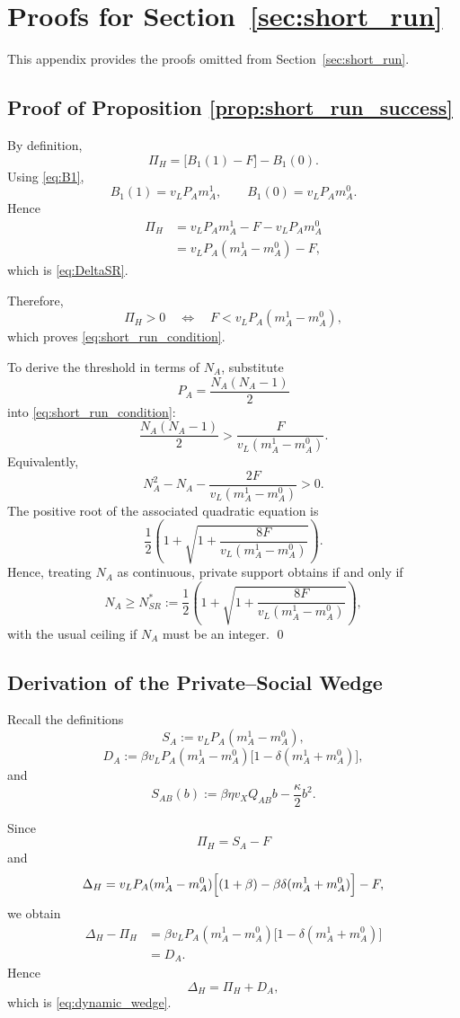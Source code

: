 \section{Proofs for Section~\ref{sec:short_run}}

This appendix provides the proofs omitted from Section~\ref{sec:short_run}.

\subsection{Proof of Proposition \ref{prop:short_run_success}}

By definition,
\[
\Pi_H
=
\bigl[B_1(1)-F\bigr]-B_1(0).
\]
Using \eqref{eq:B1},
\[
B_1(1)=v_LP_A m_A^1,
\qquad
B_1(0)=v_LP_A m_A^0.
\]
Hence
\begin{align}
\Pi_H
&=
v_LP_A m_A^1-F-v_LP_A m_A^0
\nonumber\\
&=
v_LP_A(m_A^1-m_A^0)-F,
\label{eq:app5_PiH}
\end{align}
which is \eqref{eq:DeltaSR}.

Therefore,
\[
\Pi_H>0
\quad\Longleftrightarrow\quad
F<v_LP_A(m_A^1-m_A^0),
\]
which proves \eqref{eq:short_run_condition}.

To derive the threshold in terms of $N_A$, substitute
\[
P_A=\frac{N_A(N_A-1)}{2}
\]
into \eqref{eq:short_run_condition}:
\[
\frac{N_A(N_A-1)}{2}>
\frac{F}{v_L(m_A^1-m_A^0)}.
\]
Equivalently,
\[
N_A^2-N_A-\frac{2F}{v_L(m_A^1-m_A^0)}>0.
\]
The positive root of the associated quadratic equation is
\[
\frac{1}{2}
\left(
1+
\sqrt{1+\frac{8F}{v_L(m_A^1-m_A^0)}}
\right).
\]
Hence, treating $N_A$ as continuous, private support obtains if and only if
\[
N_A\ge
N_{SR}^*
:=
\frac{1}{2}
\left(
1+
\sqrt{1+\frac{8F}{v_L(m_A^1-m_A^0)}}
\right),
\]
with the usual ceiling if $N_A$ must be an integer.
\qed

\subsection{Derivation of the Private--Social Wedge}

Recall the definitions
\[
S_A:=v_LP_A(m_A^1-m_A^0),
\]
\[
D_A:=\beta v_LP_A(m_A^1-m_A^0)\bigl[1-\delta(m_A^1+m_A^0)\bigr],
\]
and
\[
S_{AB}(b):=\beta\eta v_XQ_{AB}b-\frac{\kappa}{2}b^2.
\]

Since
\[
\Pi_H=S_A-F
\]
and
\[
\Delta_H
=
v_LP_A(m_A^1-m_A^0)\Bigl[(1+\beta)-\beta\delta(m_A^1+m_A^0)\Bigr]-F,
\]
we obtain
\begin{align}
\Delta_H-\Pi_H
&=
\beta v_LP_A(m_A^1-m_A^0)\bigl[1-\delta(m_A^1+m_A^0)\bigr]
\nonumber\\
&=D_A.
\label{eq:app5_wedge}
\end{align}
Hence
\[
\Delta_H=\Pi_H+D_A,
\]
which is \eqref{eq:dynamic_wedge}.


